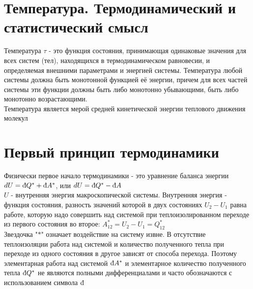 \begin{multicols*}{2}
		\section{Температура. Термодинамический и статистический смысл}
		Температура $\tau$ - это функция состояния, принимающая одинаковые значения для всех систем (тел), находящихся в термодинамическом равновесии, и определяемая внешними параметрами и энергией системы. Температура любой системы должна быть монотонной функцией её энергии, причем для всех частей системы эти функции должны быть либо монотонно убывающими, быть либо монотонно возрастающими.\\
		Температура является мерой средней кинетической энергии теплового движения молекул\\

		\section{Первый принцип термодинамики}
		Физически первое начало термодинамики - это уравнение баланса энергии\\
		$dU = \mbox{\dj}Q^* + \mbox{\dj}A^*$, или $dU = \mbox{\dj}Q^* - \mbox{\dj}A$\\
		$U$ - внутренняя энергия макроскопической системы. Внутренняя энергия - функция состояния, разность значений которой в двух состояниях $U_2 - U_1$ равна работе, которую надо совершить над системой при теплоизолированном переходе из первого состояния во второе: $A^*_{12} = U_2 - U_1 = Q^*_{12}$\\
		Звездочка "$*$" означает воздействие на систему извне. В отсутствие теплоизоляции работа над системой и количество полученного тепла при переходе из одного состояния в другое зависят от способа перехода. Поэтому элементарная работа над системой $\mbox{\dj}A^*$ и элементарное количество полученного тепла $\mbox{\dj}Q^*$ не являются полными дифференциалами и часто обозначаются с использованием символа $\mbox{\dj}$\\


\end{multicols*}
